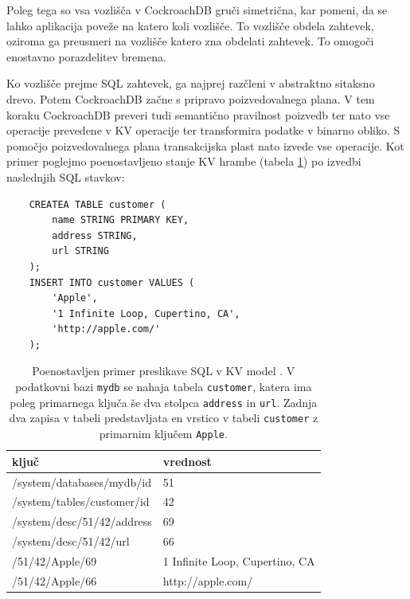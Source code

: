 \documentclass[a4paper, 12pt]{book}
\begin{document}
Poleg tega so vsa vozlišča v CockroachDB gruči simetrična, kar pomeni, da se lahko aplikacija poveže na katero koli vozlišče. To vozlišče obdela zahtevek, oziroma ga preusmeri na vozlišče katero zna obdelati zahtevek. To omogoči enostavno porazdelitev bremena.

Ko vozlišče prejme SQL zahtevek, ga najprej razčleni v abstraktno sitaksno drevo. Potem CockroachDB začne s pripravo poizvedovalnega plana. V tem koraku CockroachDB preveri tudi semantično pravilnost poizvedb ter nato vse operacije prevedene v KV operacije ter transformira podatke v binarno obliko. S pomočjo poizvedovalnega plana transakcijska plast nato izvede vse operacije. Kot primer poglejmo poenostavljeno stanje KV hrambe (tabela \ref{tbl_crdb_sql_kv_mapping}) po izvedbi naslednjih SQL stavkov:

\begin{listing}[H]
\begin{verbatim}
    CREATEA TABLE customer (
        name STRING PRIMARY KEY,
        address STRING,
        url STRING
    );
    INSERT INTO customer VALUES (
        'Apple',
        '1 Infinite Loop, Cupertino, CA',
        'http://apple.com/'
    );
\end{verbatim}
\label{sql-example-sql-mapping}
\end{listing}

\begin{table}[H]
\begin{center}
\begin{tabular}{ l|l } 
\textbf{ključ} & \textbf{vrednost} \\
\hline
/system/databases/mydb/id & 51 \\
/system/tables/customer/id & 42 \\ 
/system/desc/51/42/address & 69 \\ 
/system/desc/51/42/url & 66 \\
/51/42/Apple/69 & 1 Infinite Loop, Cupertino, CA \\
/51/42/Apple/66 & http://apple.com/ \\
\end{tabular}
\end{center}
\caption{Poenostavljen primer preslikave SQL v KV model \cite{CRDB-design}. V podatkovni bazi \texttt{mydb} se nahaja tabela \texttt{customer}, katera ima poleg primarnega ključa še dva stolpca \texttt{address} in \texttt{url}. Zadnja dva zapisa v tabeli predstavljata en vrstico v tabeli \texttt{customer} z primarnim ključem \texttt{Apple}.}
\label{tbl_crdb_sql_kv_mapping}
\end{table}
\end{document}

